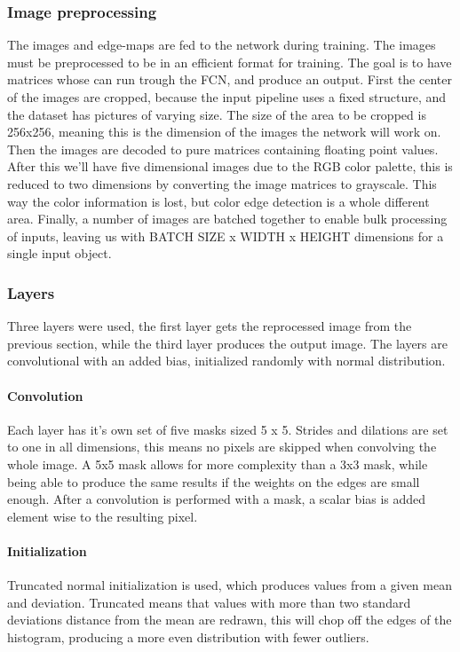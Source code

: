 \documentclass[a4paper,12pt]{article}
\begin{document}
\subsubsection{Image preprocessing}
The images and edge-maps are fed to the network during training. The images must be preprocessed to be in an efficient format for training. The goal is to have matrices whose can run trough the FCN, and produce an output. First the center of the images are cropped, because the input pipeline uses a fixed structure, and the dataset has pictures of varying size. The size of the area to be cropped is 256x256, meaning this is the dimension of the images the network will work on. Then the images are decoded to pure matrices containing floating point values. After this we'll have five dimensional images due to the RGB color palette, this is reduced to two dimensions by converting the image matrices to grayscale. This way the color information is lost, but color edge detection is a whole different area. Finally, a number of images are batched together to enable bulk processing of inputs, leaving us with BATCH SIZE x WIDTH x HEIGHT dimensions for a single input object.
\subsubsection{Layers}
Three layers were used, the first layer gets the reprocessed image from the previous section, while the third layer produces the output image. The layers are convolutional with an added bias, initialized randomly with normal distribution.\par
\paragraph{Convolution}
Each layer has it's own set of five masks sized 5 x 5. Strides and dilations are set to one in all dimensions, this means no pixels are skipped when convolving the whole image. A 5x5 mask allows for more complexity than a 3x3 mask, while being able to produce the same results if the weights on the edges are small enough. After a convolution is performed with a mask, a scalar bias is added element wise to the resulting pixel.
\paragraph{Initialization}
Truncated normal initialization is used, which produces values from a given mean and deviation. Truncated means that values with more than two standard deviations distance from the mean are redrawn, this will chop off the edges of the histogram, producing a more even distribution with fewer outliers.
\end{document}
